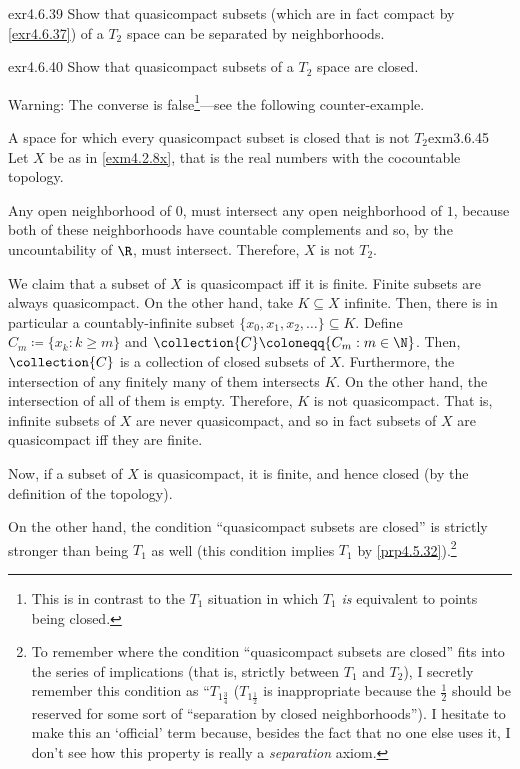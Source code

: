 \begin{exr}{}{exr4.6.39}
Show that quasicompact subsets (which are in fact compact by \cref{exr4.6.37}) of a $T_2$ space can be separated by neighborhoods.
\end{exr}
\begin{exr}{}{exr4.6.40}
Show that quasicompact subsets of a $T_2$ space are closed.
\begin{wrn}
Warning:  The converse is false\footnote{This is in contrast to the $T_1$ situation in which $T_1$ \emph{is} equivalent to points being closed.}---see the following counter-example.
\end{wrn}
\end{exr}
\begin{exm}{A space for which every quasicompact subset is closed that is not $T_2$}{exm3.6.45}
Let $X$ be as in \cref{exm4.2.8x}, that is the real numbers with the cocountable topology.

Any open neighborhood of $0$, must intersect any open neighborhood of $1$, because both of these neighborhoods have countable complements and so, by the uncountability of $\R$, must intersect.  Therefore, $X$ is not $T_2$.

We claim that a subset of $X$ is quasicompact iff it is finite.  Finite subsets are always quasicompact.  On the other hand, take $K\subseteq X$ infinite.  Then, there is in particular a countably-infinite subset $\{ x_0,x_1,x_2,\ldots \} \subseteq K$.  Define $C_m\coloneqq \{ x_k:k\geq m\}$ and $\collection{C}\coloneqq \{ C_m:m\in \N \}$.  Then, $\collection{C}$ is a collection of closed subsets of $X$.  Furthermore, the intersection of any finitely many of them intersects $K$.  On the other hand, the intersection of all of them is empty.  Therefore, $K$ is not quasicompact.  That is, infinite subsets of $X$ are never quasicompact, and so in fact subsets of $X$ are quasicompact iff they are finite.

Now, if a subset of $X$ is quasicompact, it is finite, and hence closed (by the definition of the topology).
\end{exm}
On the other hand, the condition ``quasicompact subsets are closed'' is strictly stronger than being $T_1$ as well (this condition implies $T_1$ by \cref{prp4.5.32}).\footnote{To remember where the condition ``quasicompact subsets are closed'' fits into the series of implications (that is, strictly between $T_1$ and $T_2$), I secretly remember this condition as ``$T_{1\frac{3}{4}}$ ($T_{1\frac{1}{2}}$ is inappropriate because the $\frac{1}{2}$ should be reserved for some sort of ``separation by closed neighborhoods'').  I hesitate to make this an `official' term because, besides the fact that no one else uses it, I don't see how this property is really a \emph{separation} axiom.}
